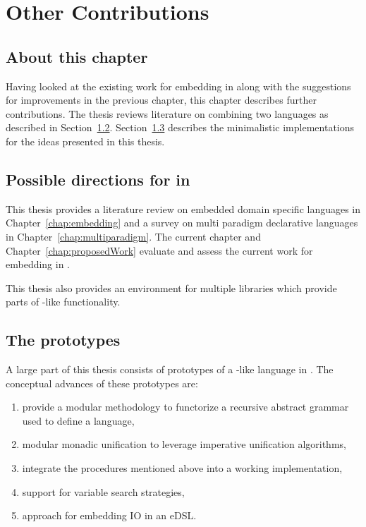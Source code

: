 \documentclass[thesis-solanki.tex]{subfiles}
\begin{document}
\chapter{Other Contributions}\label{chap:accomplishedWork}

\section{About this chapter}\label{sec:what-this-chapter:accomplishedWork}

Having looked at the existing work for embedding  in  along with the suggestions
for improvements in the previous chapter, this chapter describes further contributions.
The thesis reviews literature on combining two languages as described in Section~\ref{sec:work-in-points}.
Section~\ref{sec:prototypes} describes the minimalistic implementations for the ideas presented in this thesis.

\section{Possible directions for  in }\label{sec:work-in-points}

This thesis provides a literature review on embedded domain specific languages in Chapter~\ref{chap:embedding} and
a survey on multi paradigm declarative languages in Chapter~\ref{chap:multiparadigm}.
The current chapter and Chapter~\ref{chap:proposedWork} evaluate and assess the current work for embedding
 in .

This thesis also provides an environment for multiple  libraries which provide parts of
-like functionality.


\section{The prototypes}\label{sec:prototypes}
A large part of this thesis consists of prototypes of a -like language in .
The conceptual advances of these prototypes are:
\begin{enumerate}
\item provide a modular methodology to functorize a recursive abstract grammar used to define a language,

\item modular monadic unification to leverage imperative unification algorithms,

\item integrate the procedures mentioned above into a working  implementation,

\item support for variable search strategies,

\item approach for embedding IO in an eDSL.

\end{enumerate}
\end{document}
